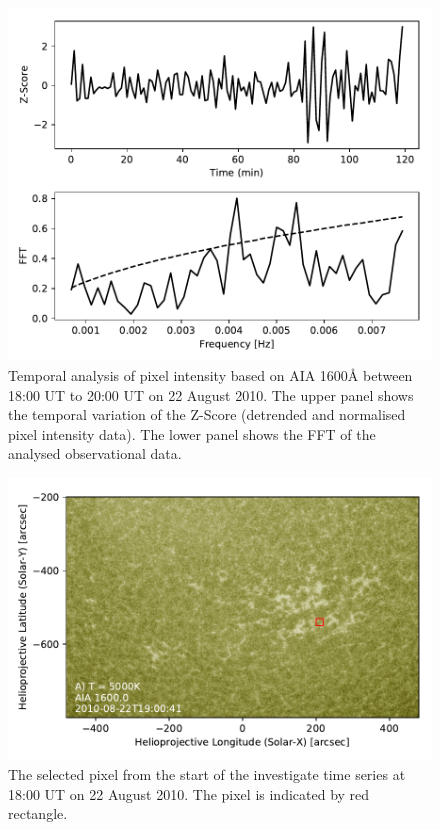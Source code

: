 \documentclass[linenumbers]{aastex63}
\begin{document}
\begin{figure}
    \centering
    \label{fft_sim}
    \includegraphics[scale=0.55]{fft_obs.pdf}
    \caption{Temporal analysis of pixel intensity based on AIA 1600{\AA} between 18:00 UT to 20:00 UT on 22 August 2010. The upper panel shows the temporal variation of the Z-Score (detrended and normalised pixel intensity data). The lower panel shows the FFT of the analysed observational data. }
\end{figure}

\begin{figure}
    \label{obs}
    \centering
    \includegraphics[scale=0.5]{obs_data.pdf}
    \caption{The selected pixel from the start of the investigate time series at 18:00 UT on 22 August 2010. The pixel is indicated by red rectangle.}
\end{figure}
\end{document}
